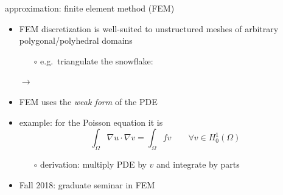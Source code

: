 \documentclass[hide notes,intlimits,usenames,dvipsnames]{beamer}
\newcommand{\grad}{\nabla}
\begin{document}
\begin{frame}{approximation: finite element method (FEM)}
\begin{itemize}
\item FEM discretization is well-suited to unstructured meshes of arbitrary polygonal/polyhedral domains
	\begin{itemize}
	\item[$\circ$] e.g.~triangulate the snowflake:
	\end{itemize}

\begin{center}
\begin{tikzpicture}[scale=1.3,baseline]  \end{tikzpicture}
\qquad $\to$ \qquad
\begin{tikzpicture}[scale=1.3,baseline]  \end{tikzpicture}
\end{center}
\item FEM uses the \emph{weak form} of the PDE
\item example: for the Poisson equation it is
    $$\int_\Omega \grad u \cdot \grad v = \int_\Omega f v \qquad \forall v \in H_0^1(\Omega)$$
    \vspace{-4mm}
	\begin{itemize}
	\item[$\circ$] derivation: multiply PDE by $v$ and integrate by parts
	\end{itemize}

\bigskip
\footnotesize
\item \alert{Fall 2018: graduate seminar in FEM}
\end{itemize}
\end{frame}
\end{document}

